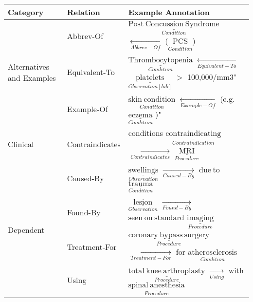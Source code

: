 \def\arraystretch{0.8}
\begin{tabular}{m{3.8cm} m{2.2cm} m{10cm}}
\toprule
    \textbf{Category} & \textbf{Relation} & \textbf{Example Annotation} \\ \midrule
    
     & Abbrev-Of     & $\underset{Condition}{\underline{\mathrm{Post\ Concussion\ Syndrome}}}$ \quad $\xleftarrow[Abbrev-Of]{}$ \quad ($\underset{Condition}{\underline{\mathrm{PCS}}}$) \\
        
    Alternatives and Examples & Equivalent-To & $\underset{Condition}{\underline{\mathrm{Thrombocytopenia}}}$ \quad $\xleftarrow[Equivalent-To]{}$ \quad $\underset{Observation[lab]}{\underline{\mathrm{platelets}}}$ \quad $>$ 100,000/mm3" \\
    
     & Example-Of    & $\underset{Condition}{\underline{\mathrm{skin\ condition}}}$ \quad $\xleftarrow[Example-Of]{}$ \quad (e.g. \quad $\underset{Condition}{\underline{\mathrm{eczema}}}$ )" \\[2ex] 
     
    \hline
     
     Clinical & Contraindicates & conditions \quad  $\underset{Contraindication}{\underline{\mathrm{contraindicating}}}$ \quad $\xrightarrow[Contraindicates]{}$ \quad $\underset{Procedure}{\underline{\mathrm{MRI}}}$ \\[2ex] 
    
    \hline
    
    \multirow{4}{*}[-13pt]{\mbox{Dependent}} &
        Caused-By     & $\underset{Observation}{\underline{\mathrm{swellings}}}$ \quad $\xrightarrow[Caused-By]{}$ \quad $\mathrm{due\ to}$ \quad $\underset{Condition}{\underline{\mathrm{trauma}}}$ \\    
        
     & Found-By      & $\underset{Observation}{\underline{\mathrm{lesion}}}$ \quad $\xrightarrow[Found-By]{}$ \quad $\mathrm{seen\ on\ standard}$ \quad $\underset{Procedure}{\underline{\mathrm{imaging}}}$ \\
    
     & Treatment-For & $\underset{Procedure}{\underline{\mathrm{coronary\ bypass\ surgery}}}$ \quad $\xrightarrow[Treatment-For]{}$ \quad $\mathrm{for}$ \quad $\underset{Condition}{\underline{\mathrm{atherosclerosis}}}$ \\
    
     & Using         & $\underset{Procedure}{\underline{\mathrm{total\ knee\ arthroplasty}}}$ \quad $\xrightarrow[Using]{}$ \quad $\mathrm{with}$ \quad  $\underset{Procedure}{\underline{\mathrm{spinal\ anesthesia}}}$ \\[2ex]
    

\end{tabular}
